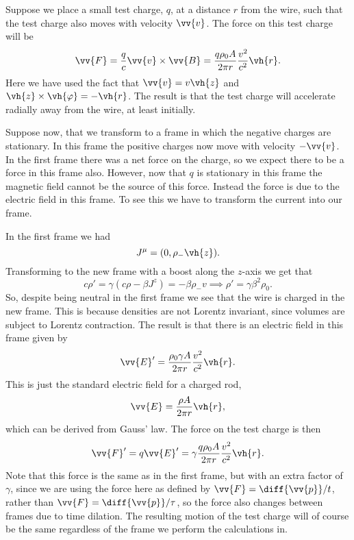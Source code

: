 Suppose we place a small test charge, \(q\), at a distance \(r\) from the wire, such that the test charge also moves with velocity \(\vv{v}\).
The force on this test charge will be
\begin{equation}
    \vv{F} = \frac{q}{c}\vv{v} \times \vv{B} = \frac{q\rho_0A}{2\pi r}\frac{v^2}{c^2}\vh{r}.
\end{equation}
Here we have used the fact that \(\vv{v} = v\vh{z}\) and \(\vh{z} \times \vh{\varphi} = -\vh{r}\).
The result is that the test charge will accelerate radially away from the wire, at least initially.

Suppose now, that we transform to a frame in which the negative charges are stationary.
In this frame the positive charges now move with velocity \(-\vv{v}\).
In the first frame there was a net force on the charge, so we expect there to be a force in this frame also.
However, now that \(q\) is stationary in this frame the magnetic field cannot be the source of this force.
Instead the force is due to the electric field in this frame.
To see this we have to transform the current into our frame.

In the first frame we had
\begin{equation}
    J^\mu = (0, \rho_-\vh{z}).
\end{equation}
Transforming to the new frame with a boost along the \(z\)-axis we get that
\begin{equation}
    c\rho' = \gamma(c\rho - \beta J^z) = -\beta\rho_-v \implies \rho' = \gamma\beta^2\rho_0.
\end{equation}
So, despite being neutral in the first frame we see that the wire is charged in the new frame.
This is because densities are not Lorentz invariant, since volumes are subject to Lorentz contraction.
The result is that there is an electric field in this frame given by
\begin{equation}
    \vv{E}' = \frac{\rho_0 \gamma A}{2\pi r}\frac{v^2}{c^2}\vh{r}.
\end{equation}
This is just the standard electric field for a charged rod,
\begin{equation}
    \vv{E} = \frac{\rho A}{2\pi r}\vh{r},
\end{equation}
which can be derived from Gauss' law.
The force on the test charge is then
\begin{equation}
    \vv{F}' = q\vv{E}' = \gamma\frac{q\rho_0A}{2\pi r}\frac{v^2}{c^2}\vh{r}.
\end{equation}
Note that this force is the same as in the first frame, but with an extra factor of \(\gamma\), since we are using the force here as defined by \(\vv{F} = \diff{\vv{p}}/{t}\), rather than \(\vv{F} = \diff{\vv{p}}/{\tau}\), so the force also changes between frames due to time dilation.
The resulting motion of the test charge will of course be the same regardless of the frame we perform the calculations in.

